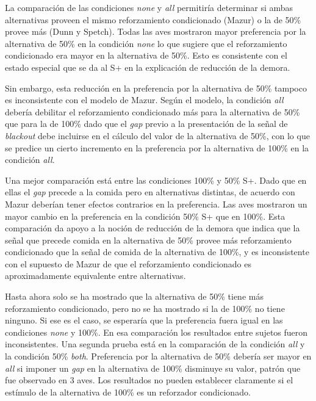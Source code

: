 \documentclass[a4paper,12pt]{article}
\begin{document}
La comparación de las condiciones {\itshape none} y {\itshape all} permitiría determinar si ambas alternativas proveen el mismo reforzamiento condicionado (Mazur) o la de 50\% provee más (Dunn y Spetch). Todas las aves mostraron mayor preferencia por la alternativa de 50\% en la condición {\itshape none} lo que sugiere que el reforzamiento condicionado era mayor en la alternativa de 50\%. Esto es consistente con el estado especial que se da al S+ en la explicación de reducción de la demora.

Sin embargo, esta reducción en la preferencia por la alternativa de 50\% tampoco es inconsistente con el modelo de Mazur. Según el modelo, la condición {\itshape all} debería debilitar el reforzamiento condicionado más para la alternativa de 50\% que para la de 100\% dado que el {\itshape gap} previo a la presentación de la señal de {\itshape blackout} debe incluirse en el cálculo del valor de la alternativa de 50\%, con lo que se predice un cierto incremento en la preferencia por la alternativa de 100\% en la condición {\itshape all}.

Una mejor comparación está entre las condiciones 100\% y 50\% S+. Dado que en ellas el {\itshape gap} precede a la comida pero en alternativas distintas, de acuerdo con Mazur deberían tener efectos contrarios en la preferencia. Las aves mostraron un mayor cambio en la preferencia en la condición 50\% S+ que en 100\%. Esta comparación da apoyo a la noción de reducción de la demora que indica que la señal que precede comida en la alternativa de 50\% provee más reforzamiento condicionado que la señal de comida de la alternativa de 100\%, y es inconsistente con el supuesto de Mazur de que el reforzamiento condicionado es aproximadamente equivalente entre alternativas.

Hasta ahora solo se ha mostrado que la alternativa de 50\% tiene más reforzamiento condicionado, pero no se ha mostrado si la de 100\% no tiene ninguno. Si ese es el caso, se esperaría que la preferencia fuera igual en las condiciones {\itshape none} y 100\%. En esa comparación los resultados entre sujetos fueron inconsistentes. Una segunda prueba está en la comparación de la condición {\itshape all} y la condición 50\% {\itshape both}. Preferencia por la alternativa de 50\% debería ser mayor en {\itshape all} si imponer un {\itshape gap} en la alternativa de 100\% disminuye su valor, patrón que fue observado en 3 aves. Los resultados no pueden establecer claramente si el estímulo de la alternativa de 100\% es un reforzador condicionado.
\end{document}
